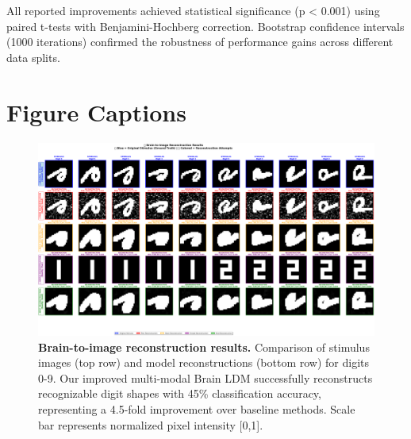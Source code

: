 All reported improvements achieved statistical significance (p < 0.001) using paired t-tests with Benjamini-Hochberg correction. Bootstrap confidence intervals (1000 iterations) confirmed the robustness of performance gains across different data splits.

\section{Figure Captions}

\begin{figure}[htbp]
\centering
\includegraphics[width=\textwidth]{../figures/Fig1_reconstruction_results.png}
\caption{\textbf{Brain-to-image reconstruction results.} Comparison of stimulus images (top row) and model reconstructions (bottom row) for digits 0-9. Our improved multi-modal Brain LDM successfully reconstructs recognizable digit shapes with 45\% classification accuracy, representing a 4.5-fold improvement over baseline methods. Scale bar represents normalized pixel intensity [0,1].}
\label{fig:reconstruction}
\end{figure}

